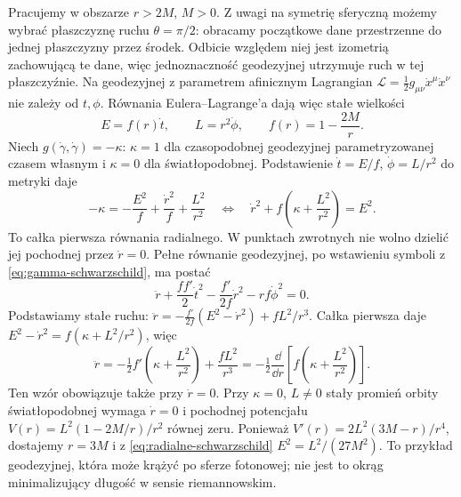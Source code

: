 \begin{przyklad}
\label{prz:geodezyjne-schwarzschild}
Pracujemy w obszarze $r>2M$, $M>0$. Z uwagi na symetrię
sferyczną możemy wybrać płaszczyznę ruchu $\theta=\pi/2$:
obracamy początkowe dane przestrzenne do jednej płaszczyzny
przez środek. Odbicie względem niej jest izometrią
zachowującą te dane, więc jednoznaczność geodezyjnej
utrzymuje ruch w tej płaszczyźnie.
Na geodezyjnej z parametrem afinicznym
Lagrangian $\mathcal L=\tfrac12g_{\mu\nu}
\dot x^\mu\dot x^\nu$ nie zależy od $t,\phi$.
Równania Eulera--Lagrange'a dają więc
stałe wielkości
\begin{equation}\label{eq:stale-schwarzschild}
 E=f(r)\dot t,\qquad L=r^2\dot\phi,
 \qquad f(r)=1-\frac{2M}{r}.
\end{equation}
Niech $g(\dot\gamma,\dot\gamma)=-\kappa$:
$\kappa=1$ dla czasopodobnej geodezyjnej
parametryzowanej czasem własnym i $\kappa=0$
dla światłopodobnej. Podstawienie
$\dot t=E/f$, $\dot\phi=L/r^2$ do metryki daje
\begin{equation}\label{eq:radialne-schwarzschild}
 -\kappa=-\frac{E^2}{f}+\frac{\dot r^2}{f}
                   +\frac{L^2}{r^2}
 \quad\Longleftrightarrow\quad
 \dot r^2+f\left(\kappa+\frac{L^2}{r^2}\right)=E^2.
\end{equation}
To całka pierwsza równania radialnego. W punktach zwrotnych
nie wolno dzielić jej pochodnej przez $\dot r=0$.
Pełne równanie geodezyjnej, po wstawieniu symboli
z \eqref{eq:gamma-schwarzschild}, ma postać
\[
 \ddot r+\frac{ff'}2\dot t^2
          -\frac{f'}{2f}\dot r^2-rf\dot\phi^2=0.
\]
Podstawiamy stałe ruchu:
$\ddot r=-\frac{f'}{2f}(E^2-\dot r^2)+fL^2/r^3$.
Całka pierwsza daje
$E^2-\dot r^2=f(\kappa+L^2/r^2)$, więc
\[
 \ddot r=-\tfrac12 f'\left(\kappa+\frac{L^2}{r^2}\right)
                  +\frac{fL^2}{r^3}
        =-\tfrac12\frac{\dd}{\dd r}
                    \left[f\left(\kappa+\frac{L^2}{r^2}\right)\right].
\]
Ten wzór obowiązuje także przy $\dot r=0$.
Przy $\kappa=0$, $L\ne0$ stały promień
orbity światłopodobnej wymaga $\dot r=0$
i pochodnej potencjału
$V(r)=L^2(1-2M/r)/r^2$ równej zeru.
Ponieważ
$V'(r)=2L^2(3M-r)/r^4$, dostajemy
$r=3M$ i z \eqref{eq:radialne-schwarzschild}
$E^2=L^2/(27M^2)$. To przykład geodezyjnej,
która może krążyć po sferze fotonowej;
nie jest to okrąg minimalizujący długość
w sensie riemannowskim.
\end{przyklad}

